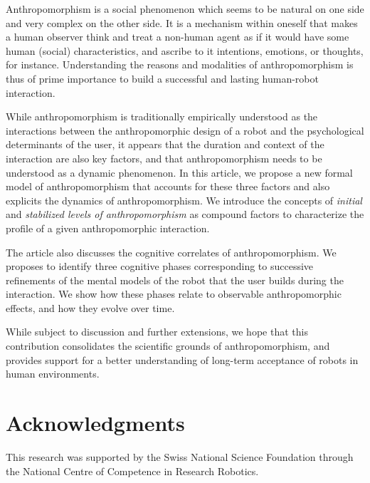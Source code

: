 \documentclass{frontiersSCNS} %
\begin{document}
Anthropomorphism is a social phenomenon which seems to be natural on one side
and very complex on the other side. It is a mechanism within oneself that makes
a human observer think and treat a non-human agent as if it would have some
human (social) characteristics, and ascribe to it intentions, emotions, or
thoughts, for instance. Understanding the reasons and modalities of
anthropomorphism is thus of prime importance to build a successful and lasting
human-robot interaction.

While anthropomorphism is traditionally empirically understood as the
interactions between the anthropomorphic design of a robot and the psychological
determinants of the user, it appears that the duration and context of the
interaction are also key factors, and that anthropomorphism needs to be
understood as a dynamic phenomenon. In this article, we propose a new formal
model of anthropomorphism that accounts for these three factors and also
explicits the dynamics of anthropomorphism. We introduce the concepts of
\emph{initial} and \emph{stabilized levels of anthropomorphism} as compound
factors to characterize the profile of a given anthropomorphic interaction.

The article also discusses the cognitive correlates of anthropomorphism. We
proposes to identify three cognitive phases corresponding to successive
refinements of the mental models of the robot that the user builds during the
interaction. We show how these phases relate to observable anthropomorphic
effects, and how they evolve over time.

While subject to discussion and further extensions, we hope that this
contribution consolidates the scientific grounds of anthropomorphism, and
provides support for a better understanding of long-term acceptance of robots in
human environments.


\section*{Acknowledgments}

This research was supported by the Swiss National Science Foundation through the National Centre of Competence in Research Robotics.


\end{document}
